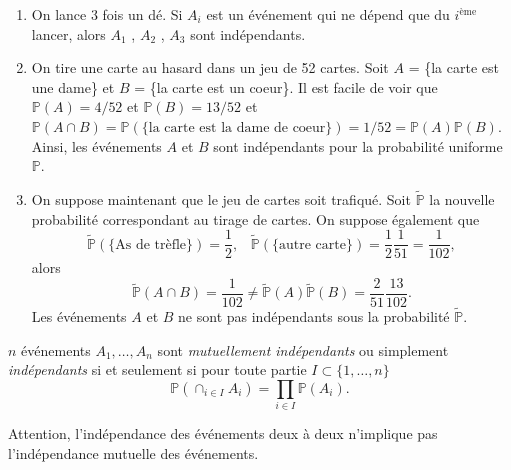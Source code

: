 \begin{exemple}\label{I-exemples-4}
\begin{enumerate}
\def\labelenumi{\arabic{enumi}.}
\tightlist
\item
  On lance 3 fois un dé. Si \(A_i\) est un événement qui ne dépend que
  du \(i^\text{ème}\) lancer, alors \(A_1\) , \(A_2\) , \(A_3\) sont
  indépendants.
\item
  On tire une carte au hasard dans un jeu de 52 cartes. Soit \(A\) =
  \{la carte est une dame\} et \(B\) = \{la carte est un coeur\}. Il est
  facile de voir que \(\mathbb{P}(A) = 4/52\) et
  \(\mathbb{P}(B) = 13/52\) et
  \(\mathbb{P}(A \cap B) = \mathbb{P}( \{\text{la carte est la dame de coeur}\} ) = 1/52 = \mathbb{P}(A) \mathbb{P}(B)\).
  Ainsi, les événements \(A\) et \(B\) sont indépendants pour la
  probabilité uniforme \(\mathbb{P}\).
\item
  On suppose maintenant que le jeu de cartes soit trafiqué. Soit
  \(\widetilde{\mathbb{P}}\) la nouvelle probabilité correspondant au
  tirage de cartes. On suppose également que
  \[ \widetilde{\mathbb{P}}(\{\text{As de trèfle}\} ) = \frac{1}{2}, \,\,\,\,\, \widetilde{\mathbb{P}}(\{\text{autre carte}\}) = \frac{1}{2} \frac{1}{51} = \frac{1}{102},\]
  alors
  \[\widetilde{\mathbb{P}}(A \cap B) = \frac{1}{102} \neq \widetilde{\mathbb{P}}(A)\widetilde{\mathbb{P}}(B) = \frac{2}{51}\frac{13}{102}.\]
  Les événements \(A\) et \(B\) ne sont pas indépendants sous la
  probabilité \(\widetilde{\mathbb{P}}\).
\end{enumerate}
\end{exemple}

\begin{definition}\label{I-induxe9pendance-de-n-uxe9vuxe9nements}

\(n\) événements \(A_1, \dots, A_n\) sont \emph{mutuellement
indépendants} ou simplement \emph{indépendants} si et seulement si pour
toute partie \(I \subset \lbrace 1,\dots, n\rbrace\) \begin{equation*}
\mathbb{P}(\cap_{i\in I} A_i) = \prod_{i\in I} \mathbb{P}(A_i).
\end{equation*}
\end{definition}

\begin{remarque}\label{I-remarque-1}
Attention, l'indépendance des événements deux à deux n'implique pas
l'indépendance mutuelle des événements.
\end{remarque}

